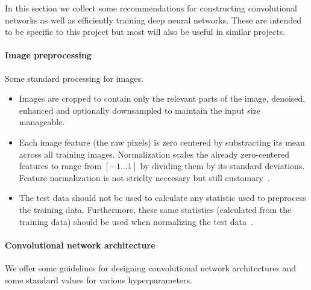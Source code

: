 In this section we collect some recommendations for constructing convolutional networks as well as efficiently training deep neural networks. These are intended to be specific to this project but most will also be useful in similar projects.


\paragraph{Image preprocessing} Some standard processing for images.
\begin{itemize}
	\item Images are cropped to contain only the relevant parts of the image, denoised, enhanced and optionally downsampled to maintain the input size manageable.

	\item Each image feature (the raw pixels) is zero centered by substracting its mean across all training images. Normalization scales the already zero-centered features to range from $[-1 \dots 1]$ by dividing them by its standard deviations. Feature normalization is not striclty neccesary but still customary~\cite{Karpathy2015}.

	\item The test data should not be used to calculate any statistic used to preprocess the training data. Furthermore, these same statistics (calculated from the training data) should be used when normalizing the test data~\cite{Karpathy2015}.
\end{itemize}

\paragraph{Convolutional network architecture}
We offer some guidelines for designing convolutional network architectures and some standard values for various hyperparameters.

